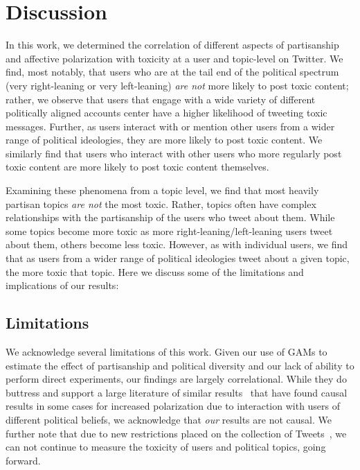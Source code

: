 \section{Discussion}
In this work, we determined the correlation of different aspects of partisanship and affective polarization with toxicity at a user and topic-level on Twitter. We find, most notably, that users who are at the tail end of the political spectrum (very right-leaning or very left-leaning) \emph{are not} more likely to post toxic content; rather, we observe that users that engage with a wide variety of different politically aligned accounts center have a higher likelihood of tweeting toxic messages. Further, as users interact with or mention other users from a wider range of political ideologies, they are more likely to post toxic content. We similarly find that users who interact with other users who more regularly post toxic content are more likely to post toxic content themselves. 

Examining these phenomena from a topic level, we find that most heavily partisan topics \emph{are not} the most toxic. Rather, topics often have complex relationships with the partisanship of the users who tweet about them. While some topics become more toxic as more right-leaning/left-leaning users tweet about them, others become less toxic. However, as with individual users, we find that as users from a wider range of political ideologies tweet about a given topic, the more toxic that topic. Here we discuss some of the limitations and implications of our results:


\subsection{Limitations}
We acknowledge several limitations of this work. Given our use of GAMs to estimate the effect of partisanship and political diversity and our lack of ability to perform direct experiments, our findings are largely correlational. While they do buttress and support a large literature of similar results~\cite{barbera2014social,barbera2015tweeting,dagoula2019mapping,bail2018exposure} that have found causal results in some cases for increased polarization due to interaction with users of different political beliefs, we acknowledge that \emph{our} results are not causal. We further note that due to new restrictions placed on the collection of Tweets~\cite{Singh2023}, we can not continue to measure the toxicity of users and political topics, going forward.

